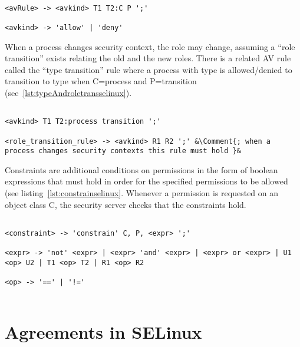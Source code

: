 \lstset{language=selinux}
\begin{lstlisting}[frame=single, caption={AV Rule},label={lst:avruleselinux}]

<avRule> -> <avkind> T1 T2:C P ';'

<avkind> -> 'allow' | 'deny'
\end{lstlisting}

When a process changes security context, the role may change, assuming a ``role transition'' exists relating the old and the new roles. There is a related AV rule called the ``type transition'' rule where a process with type  is allowed/denied to transition to type  when C=process and P=transition (see~\ref{lst:typeAndroletransselinux}).

\lstset{mathescape, language=AST} 
\begin{lstlisting}[frame=single, caption={Type Transition and Role-Allow Rules},label={lst:typeAndroletransselinux}]

<avkind> T1 T2:process transition ';'

<role_transition_rule> -> <avkind> R1 R2 ';' &\Comment{; when a process changes security contexts this rule must hold }&

\end{lstlisting}

Constraints are additional conditions on permissions in the form of boolean expressions that must hold in order for the specified permissions to be allowed (see listing~\ref{lst:constrainselinux}. Whenever a permission is requested on an object class C, the security server checks that the constraints hold.

\lstset{language=selinux}
\begin{minipage}[c]{0.95\textwidth}
\begin{lstlisting}[frame=single, caption={Constrain Rule},label={lst:constrainselinux}]

<constraint> -> 'constrain' C, P, <expr> ';'

<expr> -> 'not' <expr> | <expr> 'and' <expr> | <expr> or <expr> | U1 <op> U2 | T1 <op> T2 | R1 <op> R2

<op> -> '==' | '!='
 
\end{lstlisting}
\end{minipage}

\section{Agreements in SELinux}

